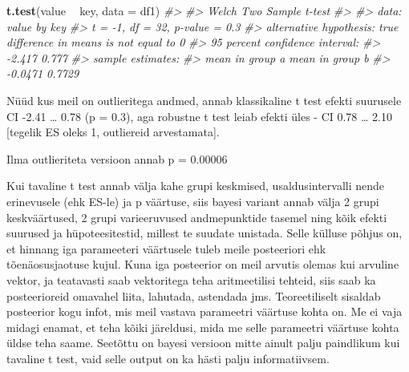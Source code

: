 \documentclass[]{book}
\newenvironment{Shaded}{\begin{snugshade}}{\end{snugshade}}
\newcommand{\KeywordTok}[1]{\textcolor[rgb]{0.13,0.29,0.53}{\textbf{#1}}}
\newcommand{\DataTypeTok}[1]{\textcolor[rgb]{0.13,0.29,0.53}{#1}}
\newcommand{\DecValTok}[1]{\textcolor[rgb]{0.00,0.00,0.81}{#1}}
\newcommand{\FloatTok}[1]{\textcolor[rgb]{0.00,0.00,0.81}{#1}}
\newcommand{\StringTok}[1]{\textcolor[rgb]{0.31,0.60,0.02}{#1}}
\newcommand{\CommentTok}[1]{\textcolor[rgb]{0.56,0.35,0.01}{\textit{#1}}}
\newcommand{\OperatorTok}[1]{\textcolor[rgb]{0.81,0.36,0.00}{\textbf{#1}}}
\newcommand{\NormalTok}[1]{#1}
\begin{document}
\begin{Shaded}
\begin{Highlighting}[]
\KeywordTok{t.test}\NormalTok{(value }\OperatorTok{~}\StringTok{ }\NormalTok{key, }\DataTypeTok{data =}\NormalTok{ df1)}
\CommentTok{#> }
\CommentTok{#>  Welch Two Sample t-test}
\CommentTok{#> }
\CommentTok{#> data:  value by key}
\CommentTok{#> t = -1, df = 32, p-value = 0.3}
\CommentTok{#> alternative hypothesis: true difference in means is not equal to 0}
\CommentTok{#> 95 percent confidence interval:}
\CommentTok{#>  -2.417  0.777}
\CommentTok{#> sample estimates:}
\CommentTok{#> mean in group a mean in group b }
\CommentTok{#>         -0.0471          0.7729}
\end{Highlighting}
\end{Shaded}

Nüüd kus meil on outlieritega andmed, annab klassikaline t test efekti
suurusele CI -2.41 \ldots{} 0.78 (p = 0.3), aga robustne t test leiab
efekti üles - CI 0.78 \ldots{} 2.10 {[}tegelik ES oleks 1, outliereid
arvestamata{]}.

Ilma outlieriteta versioon annab p = 0.00006

\begin{Shaded}
\end{Shaded}

Kui tavaline t test annab välja kahe grupi keskmised, usaldusintervalli
nende erinevusele (ehk ES-le) ja p väärtuse, siis bayesi variant annab
välja 2 grupi keskväärtused, 2 grupi varieeruvused andmepunktide tasemel
ning kõik efekti suurused ja hüpoteesitestid, millest te suudate
unistada. Selle külluse põhjus on, et hinnang iga parameeteri väärtusele
tuleb meile posteeriori ehk tõenäosusjaotuse kujul. Kuna iga posteerior
on meil arvutis olemas kui arvuline vektor, ja teatavasti saab
vektoritega teha aritmeetilisi tehteid, siis saab ka posteerioreid
omavahel liita, lahutada, astendada jms. Teoreetiliselt sisaldab
posteerior kogu infot, mis meil vastava parameetri väärtuse kohta on. Me
ei vaja midagi enamat, et teha kõiki järeldusi, mida me selle parameetri
väärtuse kohta üldse teha saame. Seetõttu on bayesi versioon mitte
ainult palju paindlikum kui tavaline t test, vaid selle output on ka
hästi palju informatiivsem.
\end{document}
